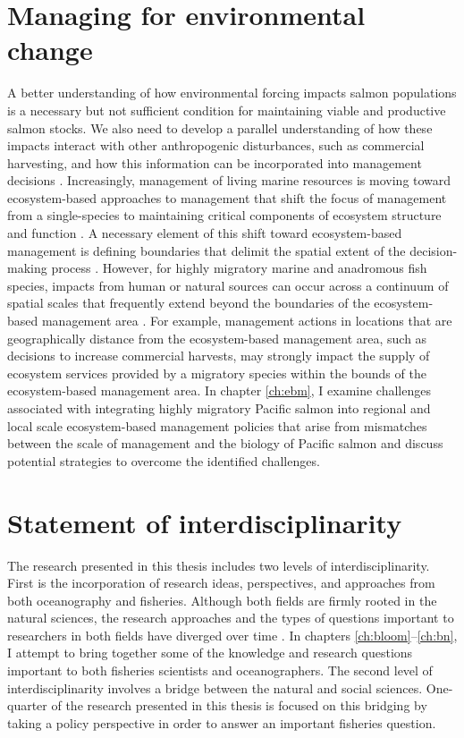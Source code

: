 \section{Managing for environmental change}

A better understanding of how environmental forcing impacts salmon populations
is a necessary but not sufficient condition for maintaining viable and
productive salmon stocks. We also need to develop a parallel understanding of
how these impacts interact with other anthropogenic disturbances, such as
commercial harvesting, and how this information can be incorporated into
management decisions \citep{Link2002a}. Increasingly, management of living
marine resources is moving toward ecosystem-based approaches to management that
shift the focus of management from a single-species to maintaining critical
components of ecosystem structure and function \citep{Grumbine1994,
Murawski2007a, Long2015}. A necessary element of this shift toward
ecosystem-based management is defining boundaries that delimit the spatial
extent of the decision-making process \citep{Engler2015, Yaffee1999}. However,
for highly migratory marine and anadromous fish species, impacts from human or
natural sources can occur across a continuum of spatial scales that frequently
extend beyond the boundaries of the ecosystem-based management area
\citep{Dallimer2015}. For example, management actions in locations that are
geographically distance from the ecosystem-based management area, such as
decisions to increase commercial harvests, may strongly impact the supply of
ecosystem services provided by a migratory species within the bounds of the
ecosystem-based management area. In chapter \ref{ch:ebm}, I examine challenges
associated with integrating highly migratory Pacific salmon into regional and
local scale ecosystem-based management policies that arise from mismatches
between the scale of management and the biology of Pacific salmon and discuss
potential strategies to overcome the identified challenges.


\section{Statement of interdisciplinarity}

The research presented in this thesis includes two levels of
interdisciplinarity. First is the incorporation of research ideas, perspectives,
and approaches from both oceanography and fisheries. Although both fields are
firmly rooted in the natural sciences, the research approaches and the types of
questions important to researchers in both fields have diverged over time
\citep{Platt2007a}. In chapters \ref{ch:bloom}--\ref{ch:bn}, I attempt to
bring together some of the knowledge and research questions important to both
fisheries scientists and oceanographers. The second level of interdisciplinarity
involves a bridge between the natural and social sciences. One-quarter of the
research presented in this thesis is focused on this bridging by taking a policy
perspective in order to answer an important fisheries question.


